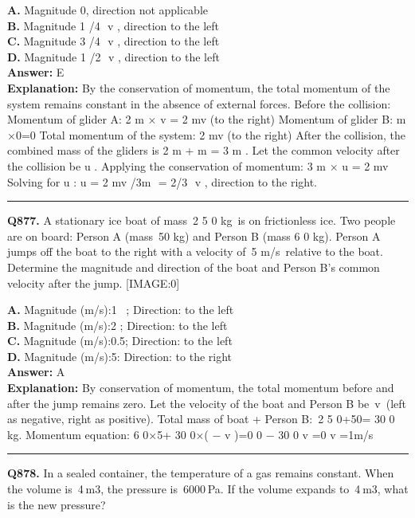 \documentclass[12pt]{article}
\begin{document}
\textbf{A.} Magnitude 0, direction not applicable \\
\textbf{B.} Magnitude 1
/4
​
v
, direction to the left \\
\textbf{C.} Magnitude 3
/4
​
v
, direction to the left \\
\textbf{D.} Magnitude 1
/2
​
v
, direction to the left \\

\textbf{Answer:} E \\
\textbf{Explanation:} By the conservation of momentum, the total momentum of the system remains constant in the absence of external forces. Before the collision:
\cdot 
Momentum of glider A:
2
m
×
v
=
2
mv
(to the right)
\cdot 
Momentum of glider B:
m
×0=0
Total momentum of the system:
2
mv
(to the right)
After the collision, the combined mass of the gliders is
2
m
+
m
=
3
m
. Let the common velocity after the collision be
u
. Applying the conservation of momentum:
3
m
×
u
=
2
mv
Solving for
u
:
u
=
2
mv
/3m
​
=
2/3
​
v
, direction to the right.

\hrule
\vspace{1em}


\noindent
\textbf{Q877.} A stationary ice boat of mass 2
5
0
kg is on frictionless ice. Two people are on board: Person A (mass 50
kg) and Person B (mass
6
0
kg). Person A jumps off the boat to the right with a velocity of 5
m/s relative to the boat. Determine the magnitude and direction of the boat and Person B’s common velocity after the jump.
[IMAGE:0]



\textbf{A.} Magnitude (m/s):1  ;
Direction:
to the left \\
\textbf{B.} Magnitude (m/s):2 ;
Direction:
to the left \\
\textbf{C.} Magnitude (m/s):0.5;
Direction:
to the left \\
\textbf{D.} Magnitude (m/s):5:
Direction:
to the right \\

\textbf{Answer:} A \\
\textbf{Explanation:} By conservation of momentum, the total momentum before and after the jump remains zero.
Let the velocity of the boat and Person B be v (left as negative, right as positive).
Total mass of boat + Person B: 2
5
0+50=
30
0
kg.
Momentum equation:
6
0×5+
30
0×(
−
v
)=0
0
−
30
0
v
=0
\implies 
v
=1m/s

\hrule
\vspace{1em}


\noindent
\textbf{Q878.} In a sealed container, the temperature of a gas remains constant. When the volume is 4 m3, the pressure is 6000 Pa. If the volume expands to 4 m3, what is the new pressure?
\end{document}

